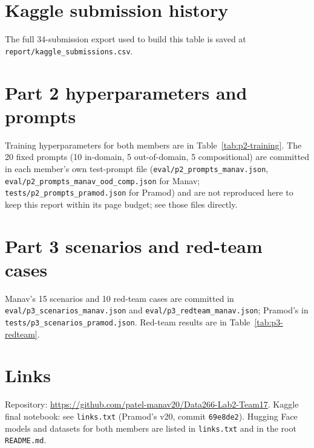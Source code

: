 \documentclass[conference,10pt]{IEEEtran}
\begin{document}
\appendices
\section{Kaggle submission history}
\label{app:kaggle}

The full 34-submission export used to build this table is saved at
\texttt{report/kaggle\_submissions.csv}.

\section{Part 2 hyperparameters and prompts}
Training hyperparameters for both members are in Table~\ref{tab:p2-training}. The 20 fixed prompts
(10 in-domain, 5 out-of-domain, 5 compositional) are committed in each member's own test-prompt file
(\texttt{eval/p2\_prompts\_manav.json}, \texttt{eval/p2\_prompts\_manav\_ood\_comp.json} for Manav;
\texttt{tests/p2\_prompts\_pramod.json} for Pramod) and are not reproduced here to keep this report
within its page budget; see those files directly.

\section{Part 3 scenarios and red-team cases}
Manav's 15 scenarios and 10 red-team cases are committed in \texttt{eval/p3\_scenarios\_manav.json}
and \texttt{eval/p3\_redteam\_manav.json}; Pramod's in \texttt{tests/p3\_scenarios\_pramod.json}.
Red-team results are in Table~\ref{tab:p3-redteam}.

\section{Links}
Repository: \url{https://github.com/patel-manav20/Data266-Lab2-Team17}. Kaggle final notebook: see
\texttt{links.txt} (Pramod's v20, commit \texttt{69e8de2}). Hugging Face models and datasets for both members are listed in
\texttt{links.txt} and in the root \texttt{README.md}.
\end{document}
